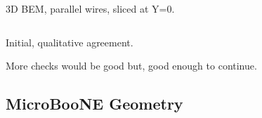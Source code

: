 \documentclass[xcolor=dvipsnames]{beamer}
\begin{document}
\begin{frame}
\begin{columns}
\begin{column}{0.5\textwidth}
\begin{center}
        \scriptsize 3D BEM, parallel wires, sliced at Y=0.
      \end{center}
    \end{column}
  \end{columns}

  \begin{center}\footnotesize
    Initial, qualitative agreement.  

    More checks would be good but, good enough to continue.
  \end{center}

\end{frame}


\subsection{MicroBooNE Geometry}
\end{document}

